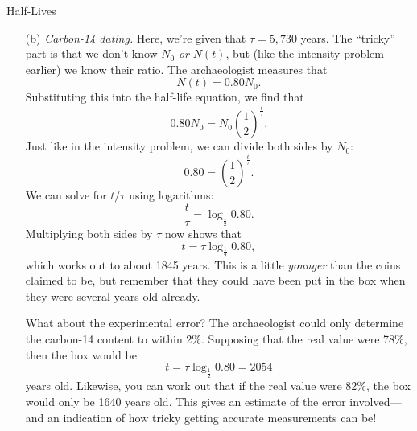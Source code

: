 \documentclass[12pt]{article}
\begin{document}
\begin{probdesc}{6}{Half-Lives}
\begin{enumerate}
\item[(b)] {\em Carbon-14 dating.} Here, we're given that $\tau =
  5,730$ years.  The ``tricky'' part is that we don't know $N_0$ {\em
  or} $N(t)$, but (like the intensity problem earlier) we know their
  ratio.  The archaeologist measures that
\begin{equation}
N(t) = 0.80 N_0.
\end{equation}
Substituting this into the half-life equation, we find that
\begin{equation}
0.80 N_0 = N_0 \left(\frac{1}{2}\right)^{\frac{t}{\tau}}.
\end{equation}
Just like in the intensity problem, we can divide both sides by $N_0$:
\begin{equation}
0.80 = \left(\frac{1}{2}\right)^{\frac{t}{\tau}}.
\end{equation}
We can solve for $t/\tau$ using logarithms:
\begin{equation}
\frac{t}{\tau} = \log_{\frac{1}{2}} 0.80.
\end{equation}
Multiplying both sides by $\tau$ now shows that
\begin{equation}
t = \tau \log_{\frac{1}{2}} 0.80,
\end{equation}
which works out to about 1845 years.  This is a little {\em younger}
than the coins claimed to be, but remember that they could have been
put in the box when they were several years old already.

What about the experimental error?  The archaeologist could only
determine the carbon-14 content to within 2\%.  Supposing that the
real value were 78\%, then the box would be
\begin{equation}
t = \tau \log_{\frac{1}{2}} 0.80 = 2054
\end{equation}
years old.  Likewise, you can work out that if the real value were
82\%, the box would only be 1640 years old.  This gives an estimate of
the error involved---and an indication of how tricky getting accurate
measurements can be!


\end{enumerate}
\end{probdesc}
\end{document}
